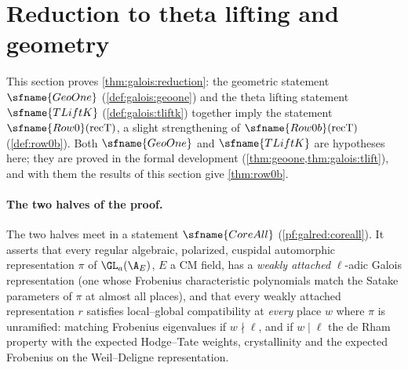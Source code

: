\section{Reduction to theta lifting and geometry}\label{sec:pf:galred}

\providecommand{\galredWD}{\mathrm{WD}}
\providecommand{\galredrc}{\mathrm{rc}}
\providecommand{\galredIrr}{\operatorname{Irr}}
\providecommand{\galredHT}{\mathrm{HT}}
\providecommand{\galredinf}{\operatorname{inf}}
\providecommand{\galredU}{\mathrm{U}}
\providecommand{\galredsph}{\mathrm{WD}^{\mathrm{ur}}}
\providecommand{\galredSat}{\operatorname{Sat}}
\providecommand{\galredcp}{\operatorname{cp}}
\providecommand{\galredtr}{\operatorname{tr}}
\providecommand{\galredFr}{\operatorname{Fr}}
\providecommand{\galredSp}{\operatorname{Sp}}

This section proves \cref{thm:galois:reduction}: the geometric statement $\sfname{GeoOne}$
(\cref{def:galois:geoone}) and the theta lifting statement $\sfname{TLiftK}$ (\cref{def:galois:tliftk})
together imply the statement $\sfname{Row0}(\mathrm{recT})$, a slight strengthening of
$\sfname{Row0b}(\mathrm{recT})$ (\cref{def:row0b}). Both $\sfname{GeoOne}$ and $\sfname{TLiftK}$ are hypotheses
here; they are proved in the formal development (\cref{thm:geoone,thm:galois:tlift}), and with them the
results of this section give \cref{thm:row0b}.

\paragraph{The two halves of the proof.} The two halves meet in a statement $\sfname{CoreAll}$
(\cref{pf:galred:coreall}). It asserts that every regular algebraic, polarized, cuspidal automorphic
representation $\pi$ of $\GL_a(\A_E)$, $E$ a CM field, has a \emph{weakly attached} $\ell$-adic Galois
representation (one whose Frobenius characteristic polynomials match the Satake parameters of $\pi$ at almost
all places), and that every weakly attached representation $r$ satisfies local--global compatibility at
\emph{every} place $w$ where $\pi$ is unramified: matching Frobenius eigenvalues if $w\nmid\ell$, and if
$w\mid\ell$ the de Rham property with the expected Hodge--Tate weights, crystallinity and the expected
Frobenius on the Weil--Deligne representation.

